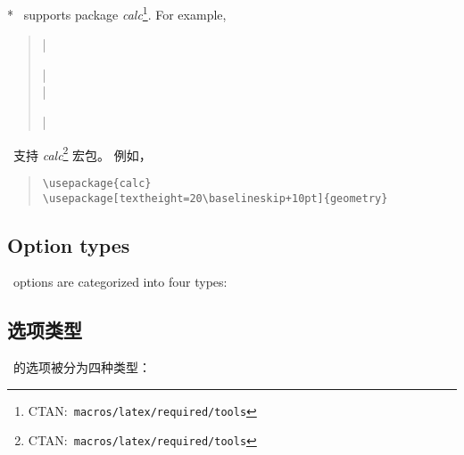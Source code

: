 \begin{paracol}{2}
\switchcolumn[0]*
\Gm\ supports package 
\textsl{calc}\footnote{CTAN:~\texttt{macros/latex/required/tools}}.
For example,
\begin{quote}
|\usepackage{calc}|\\
|\usepackage[textheight=20\baselineskip+10pt]{geometry}|
\end{quote}
\switchcolumn
\Gm\ 支持 \textsl{calc}\footnote{CTAN:~\texttt{macros/latex/required/tools}} 宏包。
例如，
\begin{quote}
\begin{verbatim}
\usepackage{calc}
\usepackage[textheight=20\baselineskip+10pt]{geometry}
\end{verbatim}
\end{quote}
\end{paracol}



\begin{paracol}{2}
\subsection{Option types}
\Gm\ options are categorized into four types:
\switchcolumn
\subsection{选项类型}
\Gm\ 的选项被分为四种类型：
\end{paracol}


